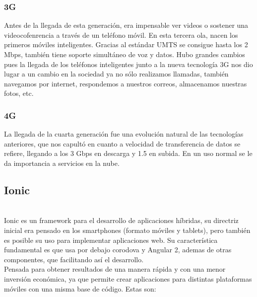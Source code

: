 \documentclass[a4paper, 11pt]{article}
\begin{document}
\begin{itemize}
            \subsubsection{3G}

              Antes de la llegada de esta generación, era impensable ver videos
              o sostener una videocofenrencia a través de un teléfono móvil.
              En esta tercera ola, nacen los primeros móviles inteligentes.
              Gracias al estándar UMTS se consigue hasta los 2 Mbps, también
              tiene soporte simultáneo de voz y datos. Hubo grandes cambios
              pues la llegada de los teléfonos inteligentes junto a la nueva
              tecnología 3G nos dio lugar a un cambio en la sociedad ya no
              sólo realizamos llamadas, también navegamos por internet, respondemos
              a nuestros correos, almacenamos nuestras fotos, etc.\\


            \subsubsection{4G}

              La llegada de la cuarta generación fue una evolución natural de
              las tecnologías anteriores, que nos capultó en cuanto a velocidad
              de transferencia de datos se refiere, llegando a los 3 Gbps en
              descarga y 1.5 en subida. En un uso normal se le da importancia a
              servicios en la nube.\\


        \subsection{Ionic}\\

            Ionic es un framework para el desarrollo de aplicaciones híbridas,
            su directriz inicial era pensado en los smartphones (formato móviles y
            tablets), pero también es posible su uso para implementar aplicaciones
            web. Su característica fundamental es que usa por debajo corodova y
            Angular 2, ademas de otras componentes, que facilitando así el
            desarrollo.\\

            Pensada para obtener resultados de una manera rápida y con una menor
            inversión económica, ya que permite crear aplicaciones para distintas
            plataformas móviles con una misma base de código. Estas son:\\



\end{itemize}
\end{document}
